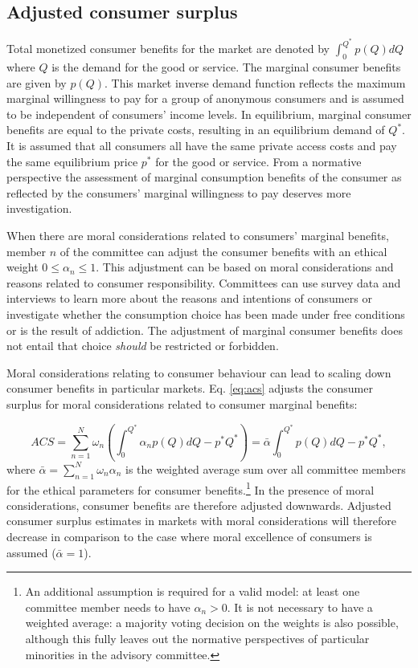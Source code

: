 \documentclass[
]{book}
\begin{document}
\hypertarget{adjusted-consumer-surplus}{%
\subsection{Adjusted consumer surplus}\label{adjusted-consumer-surplus}}

Total monetized consumer benefits for the market are denoted by \(\int_0^{Q^*}p(Q)dQ\) where \(Q\) is the demand for the good or service. The marginal consumer benefits are given by \(p(Q)\). This market inverse demand function reflects the maximum marginal willingness to pay for a group of anonymous consumers and is assumed to be independent of consumers' income levels. In equilibrium, marginal consumer benefits are equal to the private costs, resulting in an equilibrium demand of \(Q^*\). It is assumed that all consumers all have the same private access costs and pay the same equilibrium price \(p^*\) for the good or service. From a normative perspective the assessment of marginal consumption benefits of the consumer as reflected by the consumers' marginal willingness to pay deserves more investigation.

When there are moral considerations related to consumers' marginal benefits, member \(n\) of the committee can adjust the consumer benefits with an ethical weight \(0 \leq \alpha_n \leq 1\). This adjustment can be based on moral considerations and reasons related to consumer responsibility. Committees can use survey data and interviews to learn more about the reasons and intentions of consumers or investigate whether the consumption choice has been made under free conditions or is the result of addiction. The adjustment of marginal consumer benefits does not entail that choice \emph{should} be restricted or forbidden.

Moral considerations relating to consumer behaviour can lead to scaling down consumer benefits in particular markets. Eq. \eqref{eq:acs} adjusts the consumer surplus for moral considerations related to consumer marginal benefits:

\begin{equation}
ACS = \sum_{n=1}^N \omega_n \left(\int_0^{Q^*} \alpha_n p(Q)dQ - p^* Q^*\right) = \bar{\alpha} \int_0^{Q^*} p(Q)dQ - p^* Q^*,
\label{eq:acs}
\end{equation}
where \(\bar{\alpha} = \sum_{n=1}^N \omega_n \alpha_n\) is the weighted average sum over all committee members for the ethical parameters for consumer benefits.\footnote{An additional assumption is required for a valid model: at least one committee member needs to have \(\alpha_n>0\). It is not necessary to have a weighted average: a majority voting decision on the weights is also possible, although this fully leaves out the normative perspectives of particular minorities in the advisory committee.} In the presence of moral considerations, consumer benefits are therefore adjusted downwards. Adjusted consumer surplus estimates in markets with moral considerations will therefore decrease in comparison to the case where moral excellence of consumers is assumed (\(\bar{\alpha} = 1\)).
\end{document}
